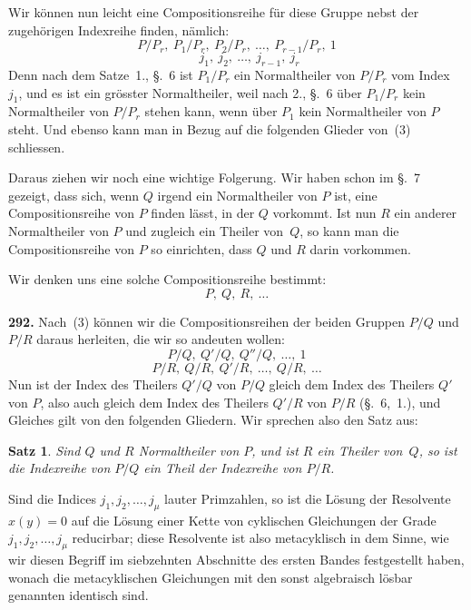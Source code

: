 \documentclass[12pt,a4paper]{article}
\newtheorem*{satz}{Satz}
\begin{document}
Wir k\"onnen nun leicht eine Compositionsreihe f\"ur diese Gruppe nebst der zugeh\"origen Indexreihe finden, n\"amlich:
\begin{equation}
\tag{3}
P/P_r,\ P_1/P_r,\ P_2/P_r,\ \ldots,\ P_{r-1}/P_r,\ 1
\end{equation}
\[
\qquad j_1,\ j_2,\ \ldots,\ j_{r-1},\ j_r
\]
Denn nach dem Satze~1., \S.~6 ist $P_1/P_r$ ein Normaltheiler von $P/P_r$ vom Index~$j_1$, und es ist ein gr\"osster Normaltheiler, weil nach 2., \S.~6 \"uber $P_1/P_r$ kein Normaltheiler von $P/P_r$ stehen kann, wenn \"uber $P_1$ kein Normaltheiler von $P$ steht. Und ebenso kann man in Bezug auf die folgenden Glieder von~(3) schliessen.

Daraus ziehen wir noch eine wichtige Folgerung. Wir haben schon im \S.~7 gezeigt, dass sich, wenn $Q$ irgend ein Normaltheiler von $P$ ist, eine Compositionsreihe von $P$ finden l\"asst, in der $Q$ vorkommt. Ist nun $R$ ein anderer Normaltheiler von $P$ und zugleich ein Theiler von~$Q$, so kann man die Compositionsreihe von $P$ so einrichten, dass $Q$ und $R$ darin vorkommen.

Wir denken uns eine solche Compositionsreihe bestimmt:
\begin{equation}
\tag{4}
P,\ Q,\ R,\ \ldots
\end{equation}

\bigskip
\noindent\textbf{292.} Nach~(3) k\"onnen wir die Compositionsreihen der beiden Gruppen $P/Q$ und $P/R$ daraus herleiten, die wir so andeuten wollen:
\begin{equation}
\tag{5}
P/Q,\ Q'/Q,\ Q''/Q,\ \ldots,\ 1
\end{equation}
\begin{equation}
\tag{6}
P/R,\ Q/R,\ Q'/R,\ \ldots,\ Q/R,\ \ldots
\end{equation}
Nun ist der Index des Theilers $Q'/Q$ von $P/Q$ gleich dem Index des Theilers $Q'$ von $P$, also auch gleich dem Index des Theilers $Q'/R$ von $P/R$ (\S.~6,~1.), und Gleiches gilt von den folgenden Gliedern. Wir sprechen also den Satz aus:

\begin{satz}
Sind $Q$ und $R$ Normaltheiler von $P$, und ist $R$ ein Theiler von~$Q$, so ist die Indexreihe von $P/Q$ ein Theil der Indexreihe von $P/R$.
\end{satz}

Sind die Indices $j_1,j_2,\ldots,j_{\mu}$ lauter Primzahlen, so ist die L\"osung der Resolvente $x(y)=0$ auf die L\"osung einer Kette von cyklischen Gleichungen der Grade $j_1,j_2,\ldots,j_{\mu}$ reducirbar; diese Resolvente ist also metacyklisch in dem Sinne, wie wir diesen Begriff im siebzehnten Abschnitte des ersten Bandes festgestellt haben, wonach die metacyklischen Gleichungen mit den sonst algebraisch l\"osbar genannten identisch sind.
\end{document}
